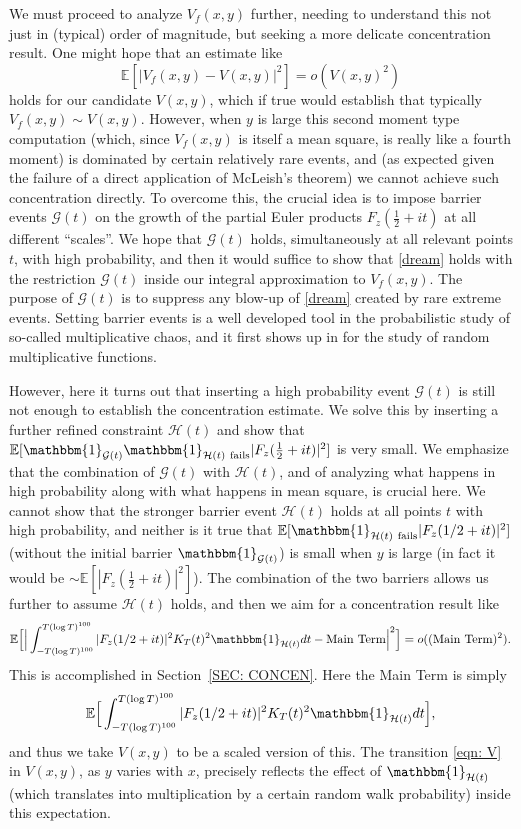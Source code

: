 \documentclass[12pt, notitlepage]{amsart}
\numberwithin{equation}{section}
\def\E{\mathbb E}
\theoremstyle{remark}
\theoremstyle{definition}
\theoremstyle{remark}
\numberwithin{equation}{section}
\begin{document}
We must proceed to analyze $V_f(x, y)$ further, needing to understand this not just in (typical) order of magnitude, but seeking a more delicate concentration result. One might hope that an estimate like 
\begin{equation}\label{dream}
   \E[|V_f(x, y) - V(x, y)|^{2}] = o(V(x, y)^{2})  
\end{equation}
holds for our candidate $V(x, y)$, which if true would establish that typically $V_f(x, y)\sim V(x, y)$. However, when $y$ is large this second moment type computation (which, since $V_f(x, y)$ is itself a mean square, is really like a fourth moment) is dominated by certain relatively rare events, and (as expected given the failure of a direct application of McLeish's theorem) we cannot achieve such concentration directly. To overcome this, 
the crucial idea is to impose barrier events $\mathcal{G}(t)$ on the growth of the partial Euler products $F_z(\frac 12+it)$ at all different ``scales''. We hope that $\mathcal{G}(t)$ holds, simultaneously at all relevant points $t$, with high probability, and then it would suffice to show that \eqref{dream} holds with the restriction $\mathcal{G}(t)$ inside our integral approximation to $V_f(x, y)$. The purpose of $\mathcal{G}(t)$ is to suppress any blow-up of \eqref{dream} created by rare extreme events. Setting barrier events is a well developed tool in the probabilistic study of so-called multiplicative chaos, and it first shows up in \cite{HarperLow} for the study of random multiplicative functions. 

However, here it turns out that inserting a high probability event $\mathcal{G}(t)$  is still not enough to establish the concentration estimate. We solve this by inserting a further refined constraint $\mathcal{H}(t)$ and show that $\E[\mathbbm{1}_{\mathcal{G}(t)}\mathbbm{1}_{\mathcal{H}(t)~\text{fails}}|F_z(\frac 12+it)|^{2} ] $ is very small. We emphasize that the combination of $\mathcal{G}(t)$ with $\mathcal{H}(t)$, and of analyzing what happens in high probability along with what happens in mean square, is crucial here.  We cannot show that the stronger barrier event $\mathcal{H}(t)$ holds at all points $t$ with high probability, and neither is it true that $\E[\mathbbm{1}_{\mathcal{H}(t)~\text{fails}}|F_z(1/2+it)|^{2} ] $ (without the initial barrier $\mathbbm{1}_{\mathcal{G}(t)}$) is small when $y$ is large (in fact it would be $\sim \E[|F_z(\frac 12+it)|^{2} ] $). The combination of the two barriers allows us further to assume $\mathcal{H}(t)$ holds, and then we aim for a concentration result like 
\[
\E\Big[\Big|\int_{-T(\log T)^{100}}^{T(\log T)^{100}}|F_z(1/2+it)|^{2} K_T(t)^{2} \mathbbm{1}_{\mathcal{H}(t)} dt - \text{Main Term}\Big|^{2}\Big] = o((\text{Main Term})^{2}). 
\]
This is accomplished in Section~\ref{SEC: CONCEN}. Here the Main Term is simply 
$$
\E \Big[ \int_{-T(\log T)^{100}}^{T(\log T)^{100}}|F_z(1/2+it)|^{2} K_T(t)^{2} \mathbbm{1}_{\mathcal{H}(t)} dt\Big],
$$
 and thus we take $V(x, y)$ to be a scaled version of this. The transition \eqref{eqn: V} in $V(x,y)$, as $y$ varies with $x$, precisely reflects the effect of $\mathbbm{1}_{\mathcal{H}(t)}$ (which translates into multiplication by a certain random walk probability) inside this expectation.
\end{document}
